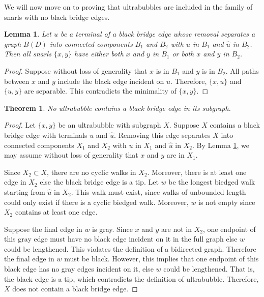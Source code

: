 \documentclass[11pt]{ucthesis}
\newtheorem{theorem}{Theorem}
\newtheorem{lemma}{Lemma}
\newtheorem*{proof}{Proof}
\begin{document}
We will now move on to proving that ultrabubbles are included in the family of snarls with no black bridge edges.

\begin{lemma}
	Let $u$ be a terminal of a black bridge edge whose removal separates a graph $B(D)$ into connected components $B_1$ and $B_2$ with $u$ in $B_1$ and $\hat u$ in $B_2$. Then all snarls $\{x,y\}$ have either both $x$ and $y$ in $B_1$ or both $x$ and $y$ in $B_2$.
	\label{lemma_snarls_have_boundaries_on_one_side_of_bridge}
\end{lemma}
\begin{proof}
	Suppose without loss of generality that $x$ is in $B_1$ and $y$ is in $B_2$. All paths between $x$ and $y$ include the black edge incident on $u$. Therefore, $\{x, u\}$ and $\{\hat u, y\}$ are separable. This contradicts the minimality of $\{x, y\}$.
\end{proof}
{
\renewcommand{\thetheorem}{\ref{theorem_ultrabubbles_have_no_bridges}}
\begin{theorem}
	No ultrabubble contains a black bridge edge in its subgraph.
\end{theorem}
}
\begin{proof}
	Let $\{x, y\}$ be an ultrabubble with subgraph $X$. Suppose $X$ contains a black bridge edge with terminals $u$ and $\hat u$. Removing this edge separates $X$ into connected components $X_1$ and $X_2$ with $u$ in $X_1$ and $\hat u$ in $X_2$. By Lemma \ref{lemma_snarls_have_boundaries_on_one_side_of_bridge}, we may assume without loss of generality that $x$ and $y$  are in $X_1$. 
	
	Since $X_2 \subset X$, there are no cyclic walks in $X_2$. Moreover, there is at least one edge in $X_2$ else the black bridge edge is a tip. Let $w$ be the longest biedged walk starting from $\hat u$ in $X_2$. This walk must exist, since walks of unbounded length could only exist if there is a cyclic biedged walk. Moreover, $w$ is not empty since $X_2$ contains at least one edge. 
	
	Suppose the final edge in $w$ is gray. Since $x$ and $y$ are not in $X_2$, one endpoint of this gray edge must have no black edge incident on it in the full graph else $w$ could be lengthened. This violates the definition of a bidirected graph. Therefore the final edge in $w$ must be black. However, this implies that one endpoint of this black edge has no gray edges incident on it, else $w$ could be lengthened. That is, the black edge is a tip, which contradicts the definition of ultrabubble. Therefore, $X$ does not contain a black bridge edge.
\end{proof}
\end{document}
